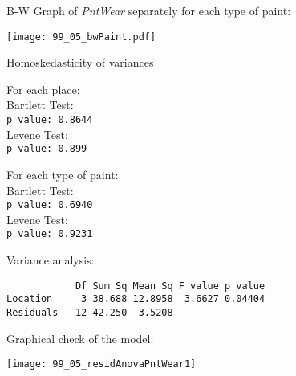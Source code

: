 \begin{frame}
  B-W Graph of \textit{PntWear} separately for each type of paint:\\
  \begin{center}
    \texttt{[image: 99\_05\_bwPaint.pdf]}
  \end{center}
\end{frame}

\begin{frame}
  Homoskedasticity of variances\\
  \vspace{0.5cm}
  \begin{minipage}[t]{0.48\textwidth}
    For each place:\\

    \vspace*{0.25cm}
    Bartlett Test:\\
    \texttt{p value: 0.8644}\\

    \vspace*{0.75cm}
    Levene Test:\\
    \texttt{p value: 0.899}\\
  \end{minipage}
  \hfill
  \begin{minipage}[t]{0.48\textwidth}
    For each type of paint:\\

    \vspace*{0.25cm}
    Bartlett Test:\\
    \texttt{p value: 0.6940}\\

    \vspace*{0.75cm}
    Levene Test:\\
    \texttt{p value: 0.9231}\\
  \end{minipage}
\end{frame}

\begin{frame}[fragile]
  \vspace{0.25cm}
  Variance analysis:
  \begin{verbatim}
            Df Sum Sq Mean Sq F value p value  
Location     3 38.688 12.8958  3.6627 0.04404
Residuals   12 42.250  3.5208    
  \end{verbatim}
\end{frame}

\begin{frame}
   Graphical check of the model:\\
  \vspace{.1cm}
  \begin{center}
    \texttt{[image: 99\_05\_residAnovaPntWear1]}
    \end{center}
\end{frame}

